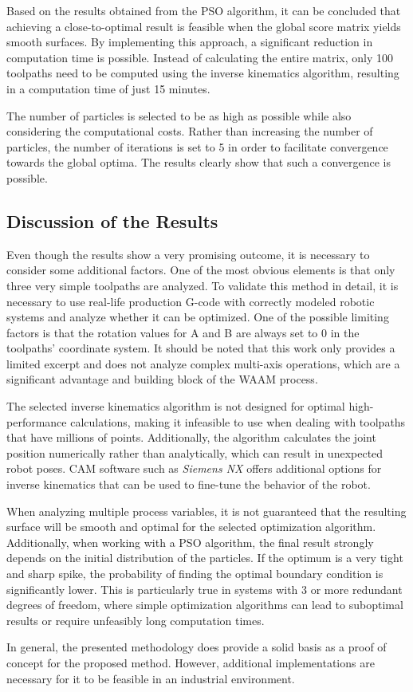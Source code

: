 Based on the results obtained from the \acrshort{PSO} algorithm, it can be concluded that achieving a close-to-optimal result is feasible when the global score matrix yields smooth surfaces. By implementing this approach, a significant reduction in computation time is possible. Instead of calculating the entire matrix, only 100 toolpaths need to be computed using the inverse kinematics algorithm, resulting in a computation time of just 15 minutes.

The number of particles is selected to be as high as possible while also considering the computational costs. Rather than increasing the number of particles, the number of iterations is set to 5 in order to facilitate convergence towards the global optima.
The results clearly show that such a convergence is possible.








\newpage
\subsection{Discussion of the Results}%
Even though the results show a very promising outcome, it is necessary to consider some additional factors. One of the most obvious elements is that only three very simple toolpaths are analyzed. To validate this method in detail, it is necessary to use real-life production G-code with correctly modeled robotic systems and analyze whether it can be optimized. One of the possible limiting factors is that the rotation values for A and B are always set to 0 in the toolpaths' coordinate system. It should be noted that this work only provides a limited excerpt and does not analyze complex multi-axis operations, which are a significant advantage and building block of the \acrshort{WAAM} process.

The selected inverse kinematics algorithm is not designed for optimal high-performance calculations, making it infeasible to use when dealing with toolpaths that have millions of points. Additionally, the algorithm calculates the joint position numerically rather than analytically, which can result in unexpected robot poses. \acrshort{CAM} software such as \textit{Siemens NX} offers additional options for inverse kinematics that can be used to fine-tune the behavior of the robot.

When analyzing multiple process variables, it is not guaranteed that the resulting surface will be smooth and optimal for the selected optimization algorithm. Additionally, when working with a \acrshort{PSO} algorithm, the final result strongly depends on the initial distribution of the particles. If the optimum is a very tight and sharp spike, the probability of finding the optimal boundary condition is significantly lower. This is particularly true in systems with 3 or more redundant degrees of freedom, where simple optimization algorithms can lead to suboptimal results or require unfeasibly long computation times.

In general, the presented methodology does provide a solid basis as a proof of concept for the proposed method. However, additional implementations are necessary for it to be feasible in an industrial environment.
